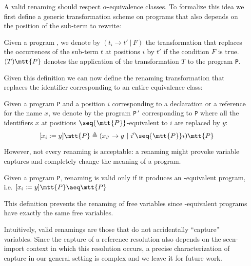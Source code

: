 
A valid renaming should respect $\alpha$-equivalence classes.
To formalize this idea we first define a generic transformation scheme on programs that also depends on the position of the sub-term to rewrite:

\begin{definition} Given a program , we denote by $(t_i \rightarrow t'\ |\ F)$ the transformation that replaces the occurrences of the sub-term $t$ at positions $i$ by $t'$ if the condition $F$ is true. $(T) \mtt{P}$ denotes the application of the transformation $T$ to the program {\tt P}.
\end{definition}

\noindent
Given this definition we can now define the renaming transformation that replaces the identifier corresponding to an entire equivalence class:
\begin{definition}[Renaming] Given a program {\tt P} and a position $i$ corresponding to a declaration or a reference for the name $x$, we denote by {} the program {\tt P'} corresponding to {\tt P} where all the identifiers $x$ at positions $\seq{\mtt{P}}$-equivalent to $i$ are replaced by $y$:
$$[x_i := y]\mtt{P} \triangleq (x_{i'} \rightarrow y\ |\ i' \seq{\mtt{P}} i)\mtt{P} $$
\end{definition}

\noindent
However, not every renaming is acceptable: a renaming might provoke variable captures and completely change the meaning of a program. %
\begin{definition} Given a program {\tt P},  renaming {\upshape [$x_i$ := $y$]} is valid only if it produces an \a-equivalent program, i.e.    
  $[x_i := y]\mtt{P} \aeq \mtt{P}$
\end{definition}
\begin{remark} This definition prevents the renaming of free variables since \a-equivalent programs have exactly the same free variables.
\end{remark}
Intuitively, valid renamings are those that do not accidentally ``capture'' variables. 
Since the capture of a reference resolution also depends on the seen-import context in which this resolution occurs, a precise characterization of capture in our general setting is complex and we leave it for future work.


